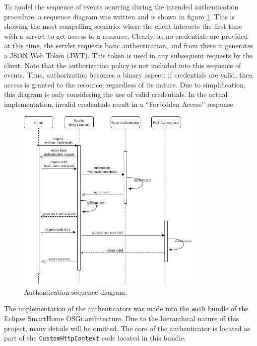 \documentclass[12pt]{article}
\begin{document}
To model the sequence of events ocurring during the intended authentication procedure, a sequence diagram was written and is shown in figure \ref{fig:esh_auth_sequence}. This is showing the most compelling scenario: where the client interacts the first time with a servlet to get access to a resource. Clearly, as no credentials are provided at this time, the servlet requests basic authentication, and from there it generates a JSON Web Token (JWT). This token is used in any subsequent requests by the client. Note that the authorization policy is not included into this sequence of events. Thus, authorization becomes a binary aspect: if credentials are valid, then access is granted to the resource, regardless of its nature. Due to simplification, this diagram is only considering the use of valid credentials. In the actual implementation, invalid credentials result in a ``Forbidden Access'' response. 

\begin{figure} [ht] 
\begin{center}
\includegraphics[width=0.8\textwidth]{esh_auth_sequence}
\caption{Authentication sequence diagram.}
\label{fig:esh_auth_sequence}
\end{center}
\end{figure}

The implementation of the authenticators was made into the \texttt{auth} bundle of the Eclipse SmartHome OSGi architecture. Due to the hierarchical nature of this project, many details will be omitted.  The core of the authenticator is located as part of the \texttt{CustomHttpContext} code located in this bundle.
\end{document}
